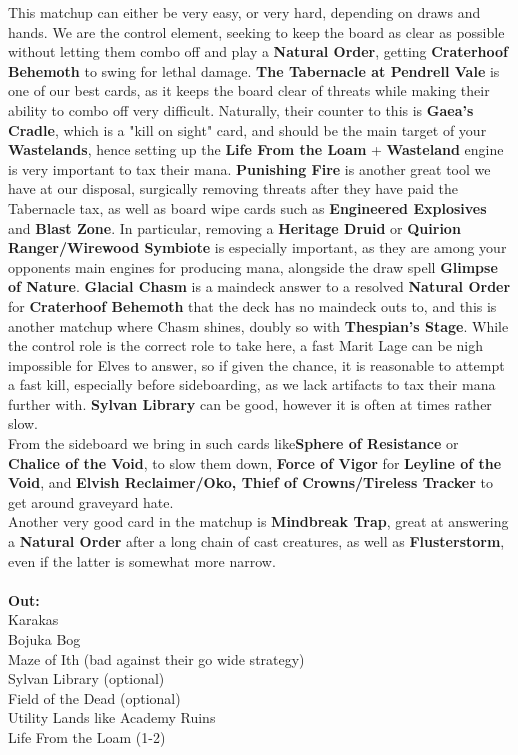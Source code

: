 \documentclass{report}
\begin{document}
This matchup can either be very easy, or very hard, depending on draws and hands. We are the control element, seeking to keep the board as clear as possible without letting them combo off and play a \textbf{Natural Order}, getting \textbf{Craterhoof Behemoth} to swing for lethal damage. \textbf{The Tabernacle at Pendrell Vale} is one of our best cards, as it keeps the board clear of threats while making their ability to combo off very difficult. Naturally, their counter to this is \textbf{Gaea's Cradle}, which is a "kill on sight" card, and should be the main target of your \textbf{Wastelands}, hence setting up the \textbf{Life From the Loam} + \textbf{Wasteland} engine is very important to tax their mana. \textbf{Punishing Fire} is another great tool we have at our disposal, surgically removing threats after they have paid the Tabernacle tax, as well as board wipe cards such as \textbf{Engineered Explosives} and \textbf{Blast Zone}. In particular, removing a \textbf{Heritage Druid} or \textbf{Quirion Ranger/Wirewood Symbiote} is especially important, as they are among your opponents main engines for producing mana, alongside the draw spell \textbf{Glimpse of Nature}. \textbf{Glacial Chasm} is a maindeck answer to a resolved \textbf{Natural Order} for \textbf{Craterhoof Behemoth} that the deck has no maindeck outs to, and this is another matchup where Chasm shines, doubly so with \textbf{Thespian's Stage}. While the control role is the correct role to take here, a fast Marit Lage can be nigh impossible for Elves to answer, so if given the chance, it is reasonable to attempt a fast kill, especially before sideboarding, as we lack artifacts to tax their mana further with. \textbf{Sylvan Library} can be good, however it is often at times rather slow.\\ From the sideboard we bring in such cards like\textbf{Sphere of Resistance} or \textbf{Chalice of the Void}, to slow them down, \textbf{Force of Vigor} for \textbf{Leyline of the Void}, and \textbf{Elvish Reclaimer/Oko, Thief of Crowns/Tireless Tracker} to get around graveyard hate.\\ Another very good card in the matchup is \textbf{Mindbreak Trap}, great at answering a \textbf{Natural Order} after a long chain of cast creatures, as well as \textbf{Flusterstorm}, even if the latter is somewhat more narrow.\\\\
\textbf{Out:}\\
Karakas\\Bojuka Bog\\Maze of Ith (bad against their go wide strategy)\\Sylvan Library (optional)\\Field of the Dead (optional)\\Utility Lands like Academy Ruins\\Life From the Loam (1-2)\\\\
\end{document}
